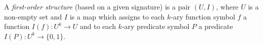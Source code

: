 \begin{dfn}
A \emph{first-order structure} (based on a given signature) is a pair $(U, I)$, where
$U$ is a non-empty set and $I$ is a map which assigns to each $k$-ary function symbol $f$
a function $I(f) \colon U^k \to U$ and to each $k$-ary predicate symbol $P$ a predicate $I(P) \colon U^k \to \{0,1\}$.
\end{dfn}